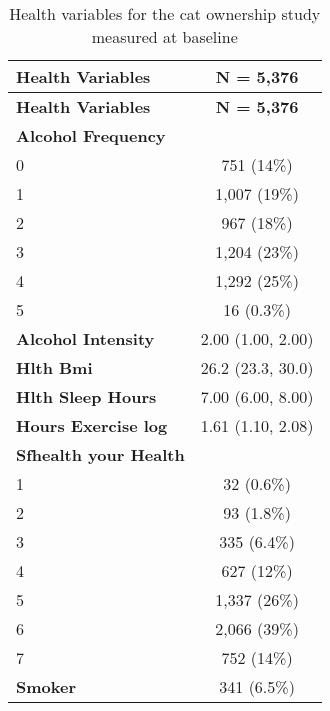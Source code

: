\documentclass[
  singlecolumn,
  9pt]{article}
\begin{document}
\begin{longtable}[]{@{}lc@{}}
\caption{Health variables for the cat ownership study measured at
baseline}\label{tbl-table_health_vars_cats-m}\tabularnewline
\toprule\noalign{}
\textbf{Health Variables} & \textbf{N = 5,376} \\
\midrule\noalign{}
\endfirsthead
\toprule\noalign{}
\textbf{Health Variables} & \textbf{N = 5,376} \\
\midrule\noalign{}
\endhead
\bottomrule\noalign{}
\endlastfoot
\textbf{Alcohol Frequency} & \\
0 & 751 (14\%) \\
1 & 1,007 (19\%) \\
2 & 967 (18\%) \\
3 & 1,204 (23\%) \\
4 & 1,292 (25\%) \\
5 & 16 (0.3\%) \\
\textbf{Alcohol Intensity} & 2.00 (1.00, 2.00) \\
\textbf{Hlth Bmi} & 26.2 (23.3, 30.0) \\
\textbf{Hlth Sleep Hours} & 7.00 (6.00, 8.00) \\
\textbf{Hours Exercise log} & 1.61 (1.10, 2.08) \\
\textbf{Sfhealth your Health} & \\
1 & 32 (0.6\%) \\
2 & 93 (1.8\%) \\
3 & 335 (6.4\%) \\
4 & 627 (12\%) \\
5 & 1,337 (26\%) \\
6 & 2,066 (39\%) \\
7 & 752 (14\%) \\
\textbf{Smoker} & 341 (6.5\%) \\
\end{longtable}
\end{document}
